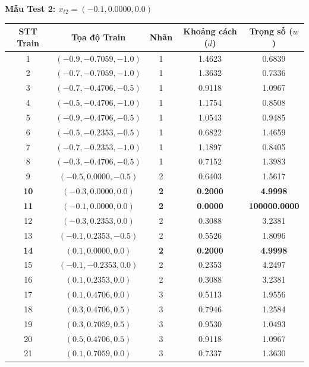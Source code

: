 \documentclass[12pt,a4paper]{article}
\begin{document}
\newpage
\textbf{Mẫu Test 2: $x_{t2} = (-0.1, 0.0000, 0.0)$}
\begin{table}[H]
\centering
\footnotesize
\renewcommand{\arraystretch}{0.85}
\begin{tabular}{|c|c|c|c|c|}
\hline
\textbf{STT Train} & \textbf{Tọa độ Train} & \textbf{Nhãn} & \textbf{Khoảng cách ($d$)} & \textbf{Trọng số ($w$)} \\ \hline
1 & $(-0.9, -0.7059, -1.0)$ & 1 & 1.4623 & 0.6839 \\ \hline
2 & $(-0.7, -0.7059, -1.0)$ & 1 & 1.3632 & 0.7336 \\ \hline
3 & $(-0.7, -0.4706, -0.5)$ & 1 & 0.9118 & 1.0967 \\ \hline
4 & $(-0.5, -0.4706, -1.0)$ & 1 & 1.1754 & 0.8508 \\ \hline
5 & $(-0.9, -0.4706, -0.5)$ & 1 & 1.0543 & 0.9485 \\ \hline
6 & $(-0.5, -0.2353, -0.5)$ & 1 & 0.6822 & 1.4659 \\ \hline
7 & $(-0.7, -0.2353, -1.0)$ & 1 & 1.1897 & 0.8405 \\ \hline
8 & $(-0.3, -0.4706, -0.5)$ & 1 & 0.7152 & 1.3983 \\ \hline
9 & $(-0.5, 0.0000, -0.5)$ & 2 & 0.6403 & 1.5617 \\ \hline
\textbf{10} & $\mathbf{(-0.3, 0.0000, 0.0)}$ & \textbf{2} & \textbf{0.2000} & \textbf{4.9998} \\ \hline
\textbf{11} & $\mathbf{(-0.1, 0.0000, 0.0)}$ & \textbf{2} & \textbf{0.0000} & \textbf{100000.0000} \\ \hline
12 & $(-0.3, 0.2353, 0.0)$ & 2 & 0.3088 & 3.2381 \\ \hline
13 & $(-0.1, 0.2353, -0.5)$ & 2 & 0.5526 & 1.8096 \\ \hline
\textbf{14} & $\mathbf{(0.1, 0.0000, 0.0)}$ & \textbf{2} & \textbf{0.2000} & \textbf{4.9998} \\ \hline
15 & $(-0.1, -0.2353, 0.0)$ & 2 & 0.2353 & 4.2497 \\ \hline
16 & $(0.1, 0.2353, 0.0)$ & 2 & 0.3088 & 3.2381 \\ \hline
17 & $(0.1, 0.4706, 0.0)$ & 3 & 0.5113 & 1.9556 \\ \hline
18 & $(0.3, 0.4706, 0.5)$ & 3 & 0.7946 & 1.2584 \\ \hline
19 & $(0.3, 0.7059, 0.5)$ & 3 & 0.9530 & 1.0493 \\ \hline
20 & $(0.5, 0.4706, 0.5)$ & 3 & 0.9118 & 1.0967 \\ \hline
21 & $(0.1, 0.7059, 0.0)$ & 3 & 0.7337 & 1.3630 \\ \hline

\end{tabular}
\end{table}
\end{document}
